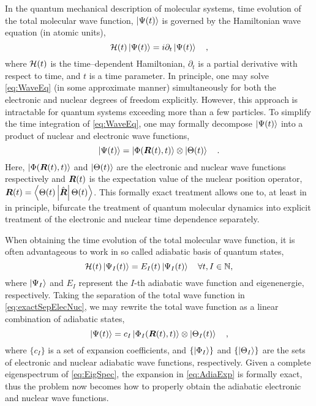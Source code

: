 In the quantum mechanical description of molecular systems, time evolution of
the total molecular wave function, $\left\vert \Psi (t) \right\rangle$ is governed by the
Hamiltonian wave equation (in atomic units),
\begin{equation}
\mathcal{H}(t) \left\vert \Psi (t) \right\rangle = i\partial_t \left\vert \Psi(t) \right\rangle \quad,
\label{eq:WaveEq}
\end{equation}
where $\mathcal{H}(t)$ is the time--dependent Hamiltonian, $\partial_t$ is a partial
derivative with respect to time, and $t$ is a time parameter.  In principle, one
may solve \cref{eq:WaveEq} (in some approximate manner) simultaneously for both
the electronic and nuclear degrees of freedom explicitly. However, this approach
is  intractable for quantum systems exceeding more than a few particles. To
simplify the time integration of \cref{eq:WaveEq}, one may formally decompose
$\left\vert \Psi (t) \right\rangle$ into a product of nuclear and electronic wave functions,
\begin{equation} 
\left\vert \Psi (t) \right\rangle = \left\vert \Phi(\boldsymbol{R}(t),t) \right\rangle\otimes\left\vert \Theta(t) \right\rangle 
\quad .  
\label{eq:exactSepElecNuc}
\end{equation} 
Here, $\left\vert \Phi(\boldsymbol{R}(t),t) \right\rangle$ and $\left\vert \Theta (t) \right\rangle$ are the electronic and
nuclear wave functions respectively and $\boldsymbol{R}(t)$ is the expectation value of
the nuclear position operator, $\boldsymbol{R}(t) =
\left\langle \Theta(t) \left\vert \hat{\boldsymbol{R}} \right\vert \Theta(t) \right\rangle$.  
This formally exact treatment\cite{Gross10_PRL123002, Cederbaum08_JCP124101,
Ghosh15_MP1} allows one to, at least in in principle, bifurcate the treatment of
quantum molecular dynamics into explicit treatment of the electronic and nuclear
time dependence separately.  

When obtaining the time evolution of the total molecular wave function, it is
often advantageous to work in so called adiabatic basis of quantum states,
\begin{equation}
\mathcal{H}(t) \left\vert \Psi_I (t) \right\rangle = E_I(t) \left\vert \Psi_I (t) \right\rangle
\quad \forall t, I \in \mathbb{N},
\label{eq:EigSpec}
\end{equation}
where $\left\vert \Psi_I \right\rangle$ and $E_I$ represent the $I$-th adiabatic wave function and
eigenenergie, respectively.  Taking the separation of the total wave function in
\cref{eq:exactSepElecNuc}, we may rewrite the total wave function as a linear
combination of adiabatic states,
\begin{equation}
\left\vert \Psi (t) \right\rangle = c_I \left\vert \Phi_I (\boldsymbol{R}(t),t) \right\rangle \otimes \left\vert \Theta_I (t) \right\rangle
\quad ,
\label{eq:AdiaExp}
\end{equation}
where $\{ c_I \}$ is a set of expansion coefficients, and $\{\left\vert \Phi_I \right\rangle\}$ and
$\{\left\vert \Theta_I \right\rangle\}$ are the sets of electronic and nuclear adiabatic wave
functions, respectively. Given a complete eigenspectrum of \cref{eq:EigSpec},
the expansion in \cref{eq:AdiaExp} is formally exact, thus the problem now
becomes how to properly obtain the adiabatic electronic and nuclear wave
functions.

